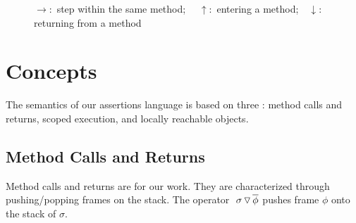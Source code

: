 {\begin{figure}[htb]
\begin{tabular}{|c|}
\end{tabular}
   \caption{$\rightarrow$:\  step within the same method; \ \ $\uparrow$:\    entering a method;\ \  $\downarrow$:  returning from a method}
   \label{fig:UpSemantics}
 \end{figure}
 

\section{ Concepts}
\label{s:auxiliary}

{The semantics of our assertions language %
is based on three   \LangOO: {method calls and returns, scoped execution}, and locally reachable objects.}

\subsection{ Method Calls and Returns}
 
Method calls and returns are  for our work. 
They are characterized through pushing/popping   frames on the stack.  
The operator   $  \ {\sigma} \, {\triangledown}\, \overline{\phi} $ pushes 
frame $\phi$ onto the stack of $\sigma$.
 
}
